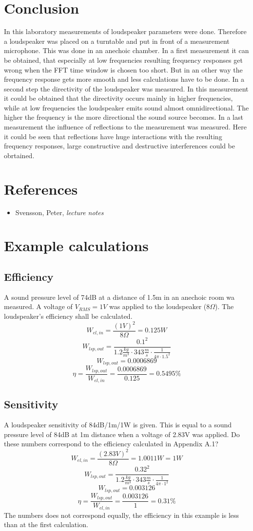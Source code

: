 \documentclass{article}
\begin{document}
\section{Conclusion}
In this laboratory measurements of loudspeaker parameters were done. Therefore a loudspeaker was placed on a turntable and put in front of a measurement microphone. This was done in an anechoic chamber. In a first measurement it can be obtained, that especially at low frequencies resulting frequency responses get wrong when the FFT time window is chosen too short. But in an other way the frequency response gets more smooth and less calculations have to be done. In a second step the directivity of the loudspeaker was measured. In this measurement it could be obtained that the directivity occurs mainly in higher frequencies, while at low frequencies the loudspeaker emits sound almost omnidirectional. The higher the frequency is the more directional the sound source becomes. In a last measurement the influence of reflections to the measurement was measured. Here it could be seen that reflections have huge interactions with the resulting frequency responses, large constructive and destructive interferences could be obrtained.

\newpage
\section*{References}
\footnotesize{
\begin{itemize}
\item Svensson, Peter, \textit{lecture notes}
\end{itemize}
}

\newpage
\appendix
\section{Example calculations}
\subsection{Efficiency}
A sound pressure level of 74dB at a distance of 1.5m in an anechoic room wa measured. A voltage of $V_{RMS}=1V$ was applied to the loudspeaker ($8\Omega$). The loudspeaker's efficiency shall be calculated.
$$W_{el,in}=\frac{(1V)^2}{8\Omega}=0.125W$$
$$W_{lsp,out}=\frac{0.1^2}{1.2\frac{kg}{m^3}\cdot 343\frac{m}{s}\cdot\frac{1}{4\pi\cdot 1.5^2}}$$
$$W_{lsp,out}=0.0006869$$
$$\eta=\frac{W_{lsp,out}}{W_{el,in}}=\frac{0.0006869}{0.125}=0.5495\%$$
\subsection{Sensitivity}
A loudspeaker sensitivity of 84dB/1m/1W is given. This is equal to a sound pressure level of 84dB at 1m distance when a voltage of 2.83V was applied. Do these numbers correspond to the efficiency calculated in Appendix A.1?
$$W_{el,in}=\frac{(2.83V)^2}{8\Omega}=1.0011W=1W$$
$$W_{lsp,out}=\frac{0.32^2}{1.2\frac{kg}{m^3}\cdot 343\frac{m}{s}\cdot\frac{1}{4\pi\cdot 1^2}}$$
$$W_{lsp,out}=0.003126$$
$$\eta=\frac{W_{lsp,out}}{W_{el,in}}=\frac{0.003126}{1}=0.31\%$$
The numbers does not correspond equally, the efficiency in this example is less than at the first calculation.
\end{document}
